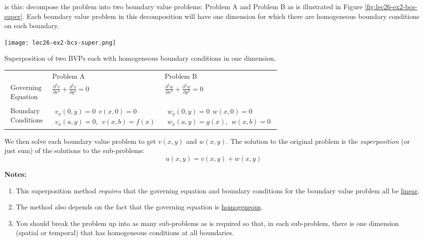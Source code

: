  is this: decompose the problem into two boundary value problems: Problem A and Problem B as is illustrated in Figure \ref{fig:lec26-ex2-bcs-super}.  Each boundary value problem in this decomposition will have one dimension for which there are homogeneous boundary conditions on each boundary.
\begin{marginfigure}
\texttt{[image: lec26-ex2-bcs-super.png]}
\caption{Superposition of two BVPs each with homogeneous boundary conditions in one dimension.}
\label{fig:lec26-ex2-bcs-super}
\end{marginfigure}
\begin{table}
\begin{tabular}{l l | l}
 & Problem A & Problem B \\ 
 $\substack{\text{Governing} \\ \text{Equation}}$ & $\frac{\partial^2 v}{\partial x^2} + \frac{\partial^2 v}{\partial y^2}=0$ & $\frac{\partial^2 w}{\partial x^2} + \frac{\partial^2 w}{\partial y^2}=0$\\
 & & \\
 $\substack{\text{Boundary}\\\text{Conditions}}$ & $\substack{v_x(0,y) = 0 \ \ v(x,0) = 0\\ v_x(a,y) = 0, \ \ v(x,b)=f(x)}$ & $\substack{w_x(0,y) = 0 \ \ w(x,0) = 0 \\ w_x(a,y) = g(x), \ \ w(x,b) = 0}$
\end{tabular}
\end{table}

\vspace{0.25cm}


\noindent We then solve each boundary value problem to get $v(x,y)$ and $w(x,y)$.  The solution to the original problem is the \emph{superposition} (or just sum) of the solutions to the sub-problems:
\begin{equation*}
u(x,y) = v(x,y) + w(x,y)
\end{equation*}

\vspace{0.25cm}

\noindent\textbf{Notes:}

\begin{enumerate}
\item This superposition method \emph{requires} that the governing equation and boundary conditions for the boundary value problem all be \underline{linear}.  
\item The method also depends on the fact that the governing equation is \underline{homogeneous}.
\item You should break the problem up into as many sub-problems as is required so that, in each sub-problem, there is one dimension (spatial or temporal) that has homogeneous conditions at all boundaries.
\end{enumerate}
